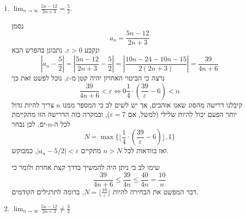 \begin{enumerate}
\begin{solbox}
        נסמן
        $$.a_n=\dfrac{n + \sin(n)}{n^2+3n}$$
    נקבע
    $\varepsilon>0$
    ונחפש
    $N$
    כך ש-
    $\left|a_n-0\right|<\varepsilon$
    לכל
    $n>N$,
    כלומר,
    $$.\left|\dfrac{n + \sin(n)}{n^2+3n}\right|<\varepsilon$$
    זהו אי-שיוויון מאתגר, ננסה "להקל על חיינו", נשים לב כי
    $$,\left|\dfrac{n + \sin(n)}{n^2+3n}\right|\leq\dfrac{|n| + |\sin(n)|}{n^2+3n}\leq\dfrac{n + 1}{n^2+3n}\leq\dfrac{n + 1}{n^2}\leq\frac{2n}{n^2}=\frac{2}{n}$$
    כאשר המעבר הראשון מבוסס עך אי-שיוויון המשולש ואילו המעבר השני על העובדה כי
    $|\sin x|\leq 1$
    לכל
    $x\in\mathbb{R}$.
    לכן נחפש
    $N$
עבורו
    $\frac{2}{n}<\varepsilon$
    לכל
    $n>N$.
    נבחר
    $N=\lfloor\frac{2}{\varepsilon}\rfloor$,
    אזי לכל
    $n>N$
    $\left|a_n-0\right|<\varepsilon$,
    מה שמוכיח את הנטען.
\end{solbox}

    \item
$\displaystyle\lim_{n \to \infty}\frac{5n-12}{2n+3}=\frac{5}{2}$.

\begin{solbox}
    נסמן
    $$a_n=\dfrac{5n-12}{2n+3}$$
    ונקבע
    $\varepsilon>0$.
    נתבונן בהפרש הבא
    $$\left|a_n-\frac{5}{2}\right|=\left|\dfrac{5n-12}{2n+3}-\frac{5}{2}\right|=\left|
    \frac{10n-24-10n-15}{2(2n+3)}
    \right|=\frac{39}{4n+6}$$
    נרצה כי הביטוי האחרון יהיה קטן מ-$\varepsilon$,
    נוכל לפשט זאת כך
    $$\frac{39}{4n+6}<\varepsilon \iff{0} \frac{1}{4}\cdot\left(\frac{39}{\varepsilon}-6\right)<n$$
    קיבלנו דרישה מהסוג שאנו אוהבים, אך יש לשים לב כי המספר ממנו
    $n$
    צריך להיות גדול יותר הפעם יכול להיות שלילי (למשל, אם
    $\varepsilon=7$), ובמקרה כזה הדרישה הזו מתקיימת לכל ה-$n$-ים, לכן נבחר
    $$N=\max\{\lfloor \frac{1}{4}\cdot\left(\frac{39}{\varepsilon}-6\right)\rfloor ,1 \}$$
ואז בוודאות לכל
$n>N$
מתקיים
$|a_n-5/2|<\varepsilon$,
כמבוקש.

שימו לב כי ניתן היה להמשיך בדרך קצת אחרת ולומר כי
$$\frac{39}{4n+6}\le \frac{39}{4n}\le\frac{40}{4n}=\frac{10}{n}$$
דבר המפשט את הבחירה להיות
$N=\lfloor \frac{10}{\varepsilon}\rfloor$,
בדומה לתרגילים הקודמים.
\end{solbox}
    \item $\displaystyle\lim_{n \to \infty}\frac{5n-12}{2n+3}\neq\frac{3}{2}$
    

\end{enumerate}
